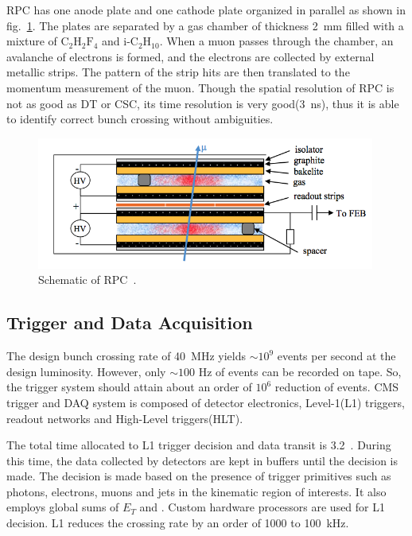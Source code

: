 RPC has one anode plate and one cathode plate organized in parallel
as shown in fig.~\ref{fig:muon_rpc}. 
The plates are separated by a gas chamber of thickness 2~mm 
filled with a mixture of $\textrm{C}_2\textrm{H}_2\textrm{F}_4$ 
and $\textrm{i-C}_2 \textrm{H}_{10}$.
When a muon passes through the chamber, an avalanche of electrons is formed, 
and the electrons are collected by external metallic strips. 
The pattern of the strip hits are then translated to the momentum measurement
of the muon. Though the spatial resolution of RPC is not as good as DT or CSC,
its time resolution is very good(3~ns), thus it is able to identify 
correct bunch crossing without ambiguities. 
%
\begin{figure}[h] 
\centering
\vspace{1cm}
\includegraphics[width=0.99\textwidth]{figures/rpc.png}
\caption{Schematic of RPC~\cite{Lenzi:2013xpa}.}
\label{fig:muon_rpc} 
\end{figure} 


\subsection{Trigger and Data Acquisition} 

The design bunch crossing rate of 40~MHz yields $\sim 10^9$ events per second
at the design luminosity. However, only $\sim 100$ Hz of events can be recorded 
on tape. So, the trigger system should attain about an order of $10^6$ 
reduction of events. CMS trigger and DAQ system is composed of 
detector electronics, Level-1(L1) triggers, readout networks and 
High-Level triggers(HLT). 

The total time allocated to L1 trigger decision and data transit is 3.2~\um.
During this time, the data collected by detectors are kept in buffers 
until the decision is made. The decision is made based on the presence 
of trigger primitives such as photons, electrons, muons and jets 
in the kinematic region of interests. It also employs global sums 
of $E_T$ and \met. Custom hardware processors are used for L1 decision.  
L1 reduces the crossing rate by an order of 1000 to 100~kHz.  

